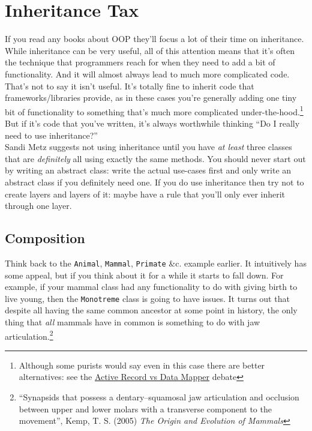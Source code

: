 \section{Inheritance Tax}


If you read any books about OOP they'll focus a lot of their time on inheritance. While inheritance can be very useful, all of this attention means that it's often the technique that programmers reach for when they need to add a bit of functionality. And it will almost always lead to much more complicated code.
\\

That's not to say it isn't useful. It's totally fine to inherit code that frameworks/libraries provide, as in these cases you're generally adding one tiny bit of functionality to something that's much more complicated under-the-hood.\footnote{Although some purists would say even in this case there are better alternatives: see the \href{https://www.thoughtfulcode.com/orm-active-record-vs-data-mapper/}{Active Record vs Data Mapper} debate} But if it's code that you've written, it's always worthwhile thinking ``Do I really need to use inheritance?''
\\

Sandi Metz suggests not using inheritance until you have \textit{at least} three classes that are \textit{definitely} all using exactly the same methods. You should never start out by writing an abstract class: write the actual use-cases first and only write an abstract class if you definitely need one. If you do use inheritance then try not to create layers and layers of it: maybe have a rule that you'll only ever inherit through one layer.


\subsection{Composition}


Think back to the \texttt{Animal}, \texttt{Mammal}, \texttt{Primate} \&c. example earlier. It intuitively has some appeal, but if you think about it for a while it starts to fall down. For example, if your mammal class had any functionality to do with giving birth to live young, then the \texttt{Monotreme} class is going to have issues. It turns out that despite all having the same common ancestor at some point in history, the only thing that \textit{all} mammals have in common is something to do with jaw articulation.\footnote{``Synapsids that possess a dentary–squamosal jaw articulation and occlusion between upper and lower molars with a transverse component to the movement'', Kemp, T. S. (2005) \textit{The Origin and Evolution of Mammals}}
\\

